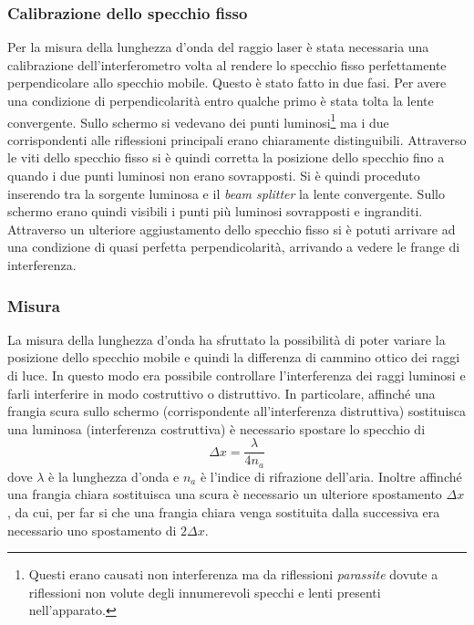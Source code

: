 \documentclass[a4paper,11pt]{article}
\begin{document}
\subsubsection{Calibrazione dello specchio fisso}\label{calib}
Per la misura della lunghezza d'onda del raggio laser è stata necessaria una calibrazione dell'interferometro volta al rendere lo specchio fisso perfettamente perpendicolare allo specchio mobile. Questo è stato fatto in due fasi. Per avere una condizione di perpendicolarità entro qualche primo è stata tolta la lente convergente. Sullo schermo si vedevano dei punti luminosi\footnote{Questi erano causati non interferenza ma da riflessioni \emph{parassite} dovute a riflessioni non volute degli innumerevoli specchi e lenti presenti nell'apparato.} ma i due corrispondenti alle riflessioni principali erano chiaramente distinguibili. Attraverso le viti dello specchio fisso si è quindi corretta la posizione dello specchio fino a quando i due punti luminosi non erano sovrapposti. Si è quindi proceduto inserendo tra la sorgente luminosa e il \emph{beam splitter}  la lente convergente. Sullo schermo erano quindi visibili i punti più luminosi sovrapposti e ingranditi. Attraverso un ulteriore aggiustamento dello specchio fisso si è potuti arrivare ad una condizione di quasi perfetta perpendicolarità, arrivando a vedere le frange di interferenza.

\subsubsection{Misura}
La misura della lunghezza d'onda ha sfruttato la possibilità di poter variare la posizione dello specchio mobile e quindi la differenza di cammino ottico dei raggi di luce. In questo modo era possibile controllare l'interferenza dei raggi luminosi e farli interferire in modo costruttivo o distruttivo. In particolare, affinché una frangia scura sullo schermo (corrispondente all'interferenza distruttiva) sostituisca una luminosa (interferenza costruttiva) è necessario spostare lo specchio di 
\begin{equation}\label{delta}
	\Delta x = \dfrac{\lambda}{4n_a}
\end{equation}
dove $ \lambda $ è la lunghezza d'onda e $ n_a $ è l'indice di rifrazione dell'aria. Inoltre affinché una frangia chiara sostituisca una scura è necessario un ulteriore spostamento $ \Delta x $, da cui, per far si che una frangia chiara venga sostituita dalla successiva era necessario uno spostamento di $ 2\Delta x $.
\end{document}
